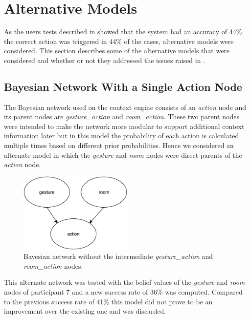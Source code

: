 \section{Alternative Models}
\label{sec:evaluation:alternative-models}

As the users tests described in  showed that the system had an accuracy of 44\% \ie the correct action was triggered in 44\% of the cases, alternative models were considered. This section describes some of the alternative models that were considered and whether or not they addressed the issues raised in .

\subsection{Bayesian Network With a Single Action Node}

The Bayesian network used on the context engine consists of an \emph{action} node and its parent nodes are \emph{gesture\_action} and \emph{room\_action}.
These two parent nodes were intended to make the network more modular to support additional context information later but in this model the probability of each action is calculated multiple times based on different prior probabilities.
Hence we considered an alternate model in which the \emph{gesture} and \emph{room} nodes were direct parents of the \emph{action} node.

\begin{figure}[h]
\centering
\includegraphics[width=0.50\textwidth]{images/DirectParentBaysianNetwork}
\caption{Bayesian network without the intermediate \emph{gesture\_action} and \emph{room\_action} nodes.}
\label{fig:evaluation:alternative-models:direct-parents}
\end{figure}

This alternate network was tested with the belief values of the \emph{gesture} and \emph{room} nodes of participant 7 and a new success rate of 36\% was computed.
Compared to the previous success rate of 41\% this model did not prove to be an improvement over the existing one and was discarded.

